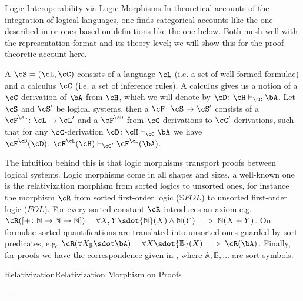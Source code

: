 \begin{tsubsection}[id=logic-morphisms]{Logic Interoperability via Logic Morphisms}
  In theoretical accounts of the integration of logical languages, one finds categorical
  accounts like the one described in {} or {}
  ones based on definitions like the one below. Both mesh well with the {\omdoc}
  representation format and its theory level; we will show this for the proof-theoretic
  account here.

\begin{definition}\label{def:logical-system}
  A {} $\cS=(\cL,\cC)$ consists of a language $\cL$ (i.e. a set of
  well-formed formulae) and a calculus $\cC$ (i.e. a set of inference rules).  A calculus
  gives us a notion of a $\cC$-derivation of $\bA$ from $\cH$, which we will denote by
  $\cD\colon\cH\vdash_\cC\bA$. Let $\cS$ and $\cS'$ be logical systems, then a
  {} $\cF\colon\cS\to\cS'$ consists of a {} $\cF^\cL\colon\cL\to\cL'$ and a {} $\cF^\cD$
  from $\cC$-derivations to $\cC'$-derivations, such that for any $\cC$-derivation
  $\cD\colon\cH\vdash_\cC\bA$ we have $\cF^\cD(\cD)\colon
  \cF^\cL(\cH)\vdash_{\cC'}\cF^\cL(\bA)$.
\end{definition}
\def\sortn{{\mathbb N}}\def\sortb{{\mathbb B}}\def\sorta{{\mathbb A}} \def\sortc{{\mathbb
    C}}\def\ofsort{\colon} The intuition behind this is that logic morphisms transport
proofs between logical systems. Logic morphisms come in all shapes and sizes, a well-known
one is the relativization morphism from sorted logics to unsorted ones, for instance the
morphism $\cR$ from sorted first-order logic (${\mathbb S} FOL$) to unsorted first-order
logic ($FOL$). For every sorted constant $\cR$ introduces an axiom
e.g. $\cR([+\colon\sortn\rightarrow\sortn\rightarrow\sortn])= \forall
X,Y\sdot\sortn(X)\land\sortn(Y)\implies\sortn(X+Y)$. On formulae sorted quantifications
are translated into unsorted ones guarded by sort predicates, e.g.  $\cR(\forall
X_\sortb\sdot\bA)=\forall X\sdot\sortb(X)\implies\cR(\bA)$. Finally, for proofs we have
the correspondence given in {}, where $\sorta,\sortb,\ldots$ are
sort symbols.
\begin{myfig}{Relativization}{Relativization Morphism on Proofs}\vspace*{-.5cm}
  \begin{textnd}
    =\hbox{\ibnc{\bA\ofsort\sortb\rightarrow\sortc}
                        {\bB\ofsort\sortb}
}
\end{textnd}
\end{myfig}
\end{tsubsection}
